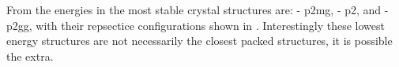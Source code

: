 From the energies in  the most stable crystal structures are: \sone{} - p2mg, \scon{} - p2, and \tri{} - p2gg, with their repsectice configurations shown in . Interestingly these lowest energy structures are not necessarily the closest packed structures, it is possible the extra.

\begin{figure}
    \centering
    \begin{subfigure}[t]{0.45\linewidth}
        \caption{}
        \label{fig:crystal sone}
    \end{subfigure}
    \begin{subfigure}[t]{0.45\linewidth}%
        \caption{}
        \label{fig:crystal scon}
    \end{subfigure}
    \begin{subfigure}{0.45\linewidth}
        \caption{}
        \label{fig:crystal tri}
    \end{subfigure}
    \caption{}
    \label{fig:crystals}
\end{figure}



